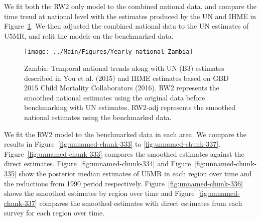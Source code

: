 \documentclass[12pt]{article}\usepackage[]{graphicx}\usepackage[]{color}
\newenvironment{knitrout}{}{} %
\begin{document}
We fit both the RW2 only model to the combined national data, and compare the time trend at national level with the estimates produced by the UN and IHME in Figure~\ref{fig:unnamed-chunk-332}. We then adjusted the combined national data to the UN estimates of U5MR, and refit the models on the benchmarked data. 

\begin{knitrout}
\color{fgcolor}\begin{figure}[bht]

{\centering \texttt{[image: ../Main/Figures/Yearly\_national\_Zambia]} 

}

\caption[Zambia]{Zambia: Temporal national trends along with UN (B3) estimates described in You et al. (2015) and IHME estimates based on GBD 2015 Child Mortality Collaborators (2016). RW2 represents the smoothed national estimates using the original data before benchmarking with UN estimates. RW2-adj represents the smoothed national estimates using the benchmarked data.}\label{fig:unnamed-chunk-332}
\end{figure}


\end{knitrout}
 

We fit the RW2 model to the benchmarked data in each area. 
We compare the results in Figure~\ref{fig:unnamed-chunk-333} to \ref{fig:unnamed-chunk-337}.
Figure~\ref{fig:unnamed-chunk-333} compares the smoothed estimates against the direct estimates. Figure~\ref{fig:unnamed-chunk-334} and Figure~\ref{fig:unnamed-chunk-335} show the posterior median estimates of U5MR in each region over time and the reductions from 1990 period respectively.
Figure~\ref{fig:unnamed-chunk-336} shows the smoothed estimates by region over time and Figure~\ref{fig:unnamed-chunk-337} compares the smoothed estimates with direct estimates from each survey for each region over time.




\end{document}
